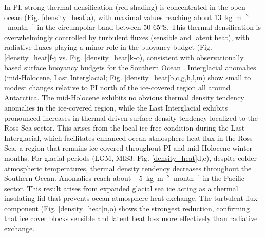 \documentclass[pdflatex,sn-nature]{sn-jnl}
\begin{document}
In PI, strong thermal densification (red shading) is concentrated in the open ocean (Fig. \ref{density_heat}a), with maximal values reaching about 13~kg~m$^{-2}$~month$^{-1}$ in the circumpolar band between 50-65°S. This thermal densification is overwhelmingly controlled by turbulent fluxes (sensible and latent heat), with radiative fluxes playing a minor role in the buoyancy budget (Fig. \ref{density_heat}f-j vs. Fig. \ref{density_heat}k-o), consistent with observationally based surface buoyancy budgets for the Southern Ocean \cite{Cerovecki2013,Abernathey2016}.
Interglacial anomalies (mid-Holocene, Last Interglacial; Fig. \ref{density_heat}b,c,g,h,l,m) show small to modest changes relative to PI north of the ice-covered region all around Antarctica. The mid-Holocene exhibits no obvious thermal density tendency anomalies in the ice-covered region, while
the Last Interglacial exhibits pronounced increases in thermal-driven surface density tendency  localized to the Ross Sea sector. This arises from the local ice-free condition during the Last Interglacial, which facilitates enhanced ocean-atmosphere heat flux in the Ross Sea, a region that remains ice-covered throughout PI and mid-Holocene winter months.
For glacial periods (LGM, MIS3; Fig. \ref{density_heat}d,e), despite colder atmospheric temperatures, thermal density tendency decreases throughout the Southern Ocean. Anomalies reach about $-5$~kg~m$^{-2}$~month$^{-1}$ in the Pacific sector. This result arises from expanded glacial sea ice acting as a thermal insulating lid that prevents ocean-atmosphere heat exchange. The turbulent flux component (Fig. \ref{density_heat}n,o) shows the strongest reduction, confirming that ice cover blocks sensible and latent heat loss more effectively than radiative exchange.
\end{document}
